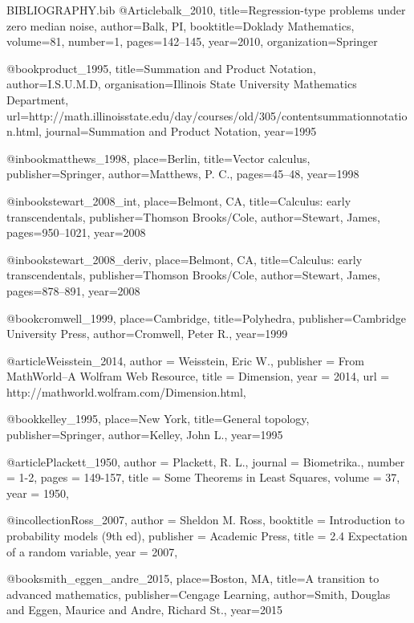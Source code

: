 \RequirePackage{filecontents}
\begin{filecontents}{BIBLIOGRAPHY.bib}
@Article{balk_2010,
  title={Regression-type problems under zero median noise},
  author={Balk, PI},
  booktitle={Doklady Mathematics},
  volume={81},
  number={1},
  pages={142--145},
  year={2010},
  organization={Springer}
}

@book{product_1995, 
 title={Summation and Product Notation},
 author={I.S.U.M.D},
 organisation={Illinois State University Mathematics Department},
 url={http://math.illinoisstate.edu/day/courses/old/305/contentsummationnotation.html},  
 journal={Summation and Product Notation}, 
 year={1995}}
 
 @inbook{matthews_1998, 
 place={Berlin}, 
 title={Vector calculus}, 
 publisher={Springer}, 
 author={Matthews, P. C.}, 
 pages={45--48},
 year={1998}}


@inbook{stewart_2008_int, 
 place={Belmont, CA}, 
 title={Calculus: early transcendentals}, 
 publisher={Thomson Brooks/Cole}, 
 author={Stewart, James}, 
 pages={950--1021},
 year={2008}}
 
 @inbook{stewart_2008_deriv, 
 place={Belmont, CA}, 
 title={Calculus: early transcendentals}, 
 publisher={Thomson Brooks/Cole}, 
 author={Stewart, James}, 
 pages={878--891},
 year={2008}}
 
@book{cromwell_1999, 
 place={Cambridge}, 
 title={Polyhedra}, 
 publisher={Cambridge University Press}, 
 author={Cromwell, Peter R.}, 
 year={1999}}
 
 @article{Weisstein_2014,
author = {Weisstein, Eric W.},
publisher = {From MathWorld--A Wolfram Web Resource},
title = {Dimension},
year = {2014},
url = {http://mathworld.wolfram.com/Dimension.html},
}

@book{kelley_1995, 
 place={New York}, 
 title={General topology}, 
 publisher={Springer}, 
 author={Kelley, John L.}, 
 year={1995}}
 
 @article{Plackett_1950,
author = {Plackett, R. L.},
journal = {Biometrika.},
number = {1-2},
pages = {149-157},
title = {Some Theorems in Least Squares},
volume = {37},
year = {1950},
}

@incollection{Ross_2007,
author = {Sheldon M. Ross},
booktitle = {Introduction to probability models (9th ed)},
publisher = {Academic Press},
title = {2.4 Expectation of a random variable},
year = {2007},
}

@book{smith_eggen_andre_2015,
place={Boston, MA}, 
title={A transition to advanced mathematics}, 
publisher={Cengage Learning}, 
author={Smith, Douglas and Eggen, Maurice and Andre, Richard St.}, 
year={2015}}

\end{filecontents}
\documentclass[11pt,a4paper]{article}
\usepackage{graphicx}
\graphicspath{ {images/} }
\usepackage{natbib}
\usepackage[rightcaption]{sidecap}
\usepackage{svg}
\usepackage{transparent}
\usepackage{xcolor}
\usepackage{relsize}
\usepackage{amsmath}
\usepackage{amsfonts}
\usepackage[margin=2cm]{geometry}
\usepackage{fancyhdr}
\usepackage{enumitem}
\pagestyle{fancy}
\usepackage{float}
\usepackage{cancel}
\usepackage{subfig}
\usepackage{multirow}
\usepackage[utf8]{inputenc}

